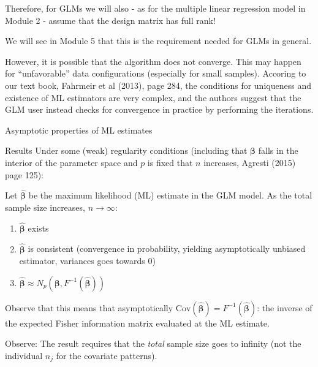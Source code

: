 \documentclass[
  ignorenonframetext,
]{beamer}
\providecommand{\tightlist}{%
  \setlength{\itemsep}{0pt}\setlength{\parskip}{0pt}}
\begin{document}
\begin{frame}
Therefore, for GLMs we will also - as for the multiple linear regression
model in Module 2 - assume that the design matrix has full rank!

We will see in Module 5 that this is the requirement needed for GLMs in
general.

However, it is possible that the algorithm does not converge. This may
happen for ``unfavorable'' data configurations (especially for small
samples). Accoring to our text book, Fahrmeir et al (2013), page 284,
the conditions for uniqueness and existence of ML estimators are very
complex, and the authors suggest that the GLM user instead checks for
convergence in practice by performing the iterations.
\end{frame}

\begin{frame}{Asymptotic properties of ML estimates}
\protect\hypertarget{asymptotic-properties-of-ml-estimates}{}
\begin{block}{Results}
\protect\hypertarget{results}{}
Under some (weak) regularity conditions (including that
\(\boldsymbol{\beta}\) falls in the interior of the parameter space and
\(p\) is fixed that \(n\) increases, Agresti (2015) page 125):

Let \(\hat{\boldsymbol{\beta}}\) be the maximum likelihood (ML) estimate
in the GLM model. As the total sample size increases,
\(n\rightarrow \infty\):

\begin{enumerate}
\tightlist
\item
  \(\hat{\boldsymbol{\beta}}\) exists
\item
  \(\hat{\boldsymbol{\beta}}\) is consistent (convergence in
  probability, yielding asymptotically unbiased estimator, variances
  goes towards 0)
\item
  \(\hat{\boldsymbol{\beta}} \approx N_p(\boldsymbol{\beta},F^{-1}(\hat{\boldsymbol{\beta}}))\)
\end{enumerate}

Observe that this means that asymptotically
\(\text{Cov}(\hat{\boldsymbol{\beta}})=F^{-1}(\hat{\boldsymbol{\beta}})\):
the inverse of the expected Fisher information matrix evaluated at the
ML estimate.

Observe: The result requires that the \emph{total} sample size goes to
infinity (not the individual \(n_j\) for the covariate patterns).
\end{block}
\end{frame}
\end{document}
